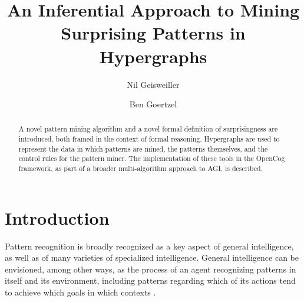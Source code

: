 \documentclass[runningheads]{llncs}
\begin{document}
%
\title{An Inferential Approach to Mining Surprising Patterns in Hypergraphs}
%
%
\author{Nil Geisweiller
  \and Ben Goertzel}
%
%
%
\maketitle              %
%

\begin{abstract}
  A novel pattern mining algorithm and a novel formal
  definition of surprisingness are introduced, both framed in
  the context of formal reasoning.   Hypergraphs are used 
  to represent the data in which patterns are mined, the patterns
  themselves, and the control rules for the pattern miner.
   The implementation of these
  tools in the OpenCog framework, as part of a broader
  multi-algorithm approach to AGI, is described.

\end{abstract}

\section{Introduction}

Pattern recognition is broadly recognized as a key aspect of general
intelligence, as well as of many varieties of specialized
intelligence.
General
intelligence can be envisioned, among other ways, as the process of an
agent recognizing patterns in itself and its environment, including
patterns regarding which of its actions tend to achieve which goals in
which contexts \cite{Goertzel2014EGI1}.
\end{document}
